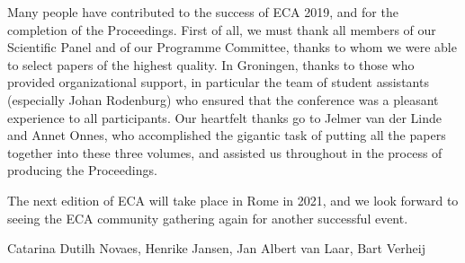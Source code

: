 Many people have contributed to the success of ECA 2019, and for the completion of the Proceedings. First of all, we must thank all members of our Scientific Panel and of our Programme Committee, thanks to whom we were able to select papers of the highest quality. In Groningen, thanks to those who provided organizational support, in particular the team of student assistants (especially Johan Rodenburg) who ensured that the conference was a pleasant experience to all participants. Our heartfelt thanks go to Jelmer van der Linde and Annet Onnes, who accomplished the gigantic task of putting all the papers together into these three volumes, and assisted us throughout in the process of producing the Proceedings.

The next edition of ECA will take place in Rome in 2021, and we look forward to seeing the ECA community gathering again for another successful event.

\medskip

\noindent Catarina Dutilh Novaes, Henrike Jansen, Jan Albert van Laar, Bart Verheij
